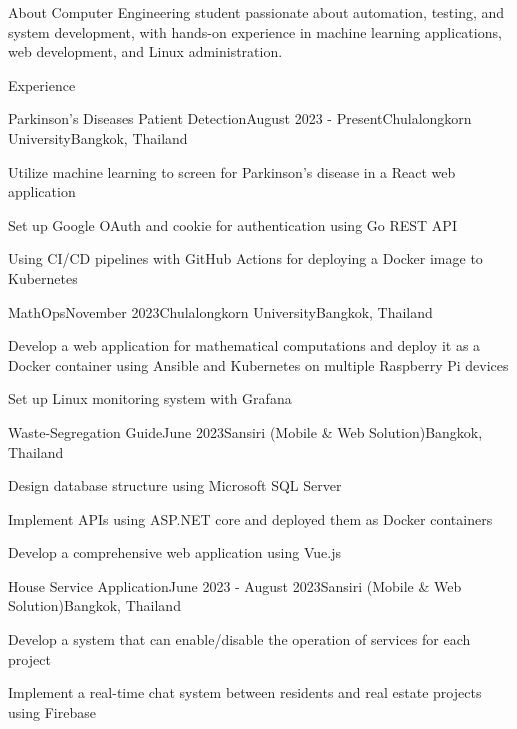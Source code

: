\documentclass[12pt]{resume}
\begin{document}
\begin{rSection}{About}
    Computer Engineering student passionate about automation, testing, and system development, with hands-on experience in machine learning applications, web development, and Linux administration.
\end{rSection}

\begin{rSection}{Experience}

	\begin{rSubsection}{Parkinson's Diseases Patient Detection}{August 2023 - Present}{Chulalongkorn University}{Bangkok, Thailand}
        \item Utilize machine learning to screen for Parkinson's disease in a React web application
        \item Set up Google OAuth and cookie for authentication using Go REST API
        \item Using CI/CD pipelines with GitHub Actions for deploying a Docker image to Kubernetes
	\end{rSubsection}

	\begin{rSubsection}{MathOps}{November 2023}{Chulalongkorn University}{Bangkok, Thailand}
        \item Develop a web application for mathematical computations and deploy it as a Docker container using Ansible and Kubernetes on multiple Raspberry Pi devices
        \item Set up Linux monitoring system with Grafana
	\end{rSubsection}

	\begin{rSubsection}{Waste-Segregation Guide}{June 2023}{Sansiri (Mobile \& Web Solution)}{Bangkok, Thailand}
        \item Design database structure using Microsoft SQL Server
        \item Implement APIs using ASP.NET core and deployed them as Docker containers
        \item Develop a comprehensive web application using Vue.js
	\end{rSubsection}

    \begin{rSubsection}{House Service Application}{June 2023 - August 2023}{Sansiri (Mobile \& Web Solution)}{Bangkok, Thailand}
        \item Develop a system that can enable/disable the operation of services for each project
        \item Implement a real-time chat system between residents and real estate projects using Firebase
    \end{rSubsection}

\end{rSection}
\end{document}
